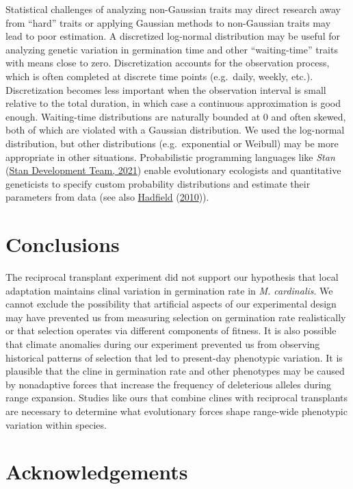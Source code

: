 \documentclass[
  12pt,
]{article}
\begin{document}
Statistical challenges of analyzing non-Gaussian traits may direct research away from ``hard'' traits or applying Gaussian methods to non-Gaussian traits may lead to poor estimation. A discretized log-normal distribution may be useful for analyzing genetic variation in germination time and other ``waiting-time'' traits with means close to zero. Discretization accounts for the observation process, which is often completed at discrete time points (e.g.~daily, weekly, etc.). Discretization becomes less important when the observation interval is small relative to the total duration, in which case a continuous approximation is good enough. Waiting-time distributions are naturally bounded at 0 and often skewed, both of which are violated with a Gaussian distribution. We used the log-normal distribution, but other distributions (e.g.~exponential or Weibull) may be more appropriate in other situations. Probabilistic programming languages like \emph{Stan} (\protect\hyperlink{ref-stan_development_team_stan_2021}{Stan Development Team, 2021}) enable evolutionary ecologists and quantitative geneticists to specify custom probability distributions and estimate their parameters from data (see also \protect\hyperlink{ref-hadfield_mcmc_2010}{Hadfield} (\protect\hyperlink{ref-hadfield_mcmc_2010}{2010})).

\hypertarget{conclusions}{%
\section{Conclusions}\label{conclusions}}

The reciprocal transplant experiment did not support our hypothesis that local adaptation maintains clinal variation in germination rate in \emph{M. cardinalis}. We cannot exclude the possibility that artificial aspects of our experimental design may have prevented us from measuring selection on germination rate realistically or that selection operates via different components of fitness. It is also possible that climate anomalies during our experiment prevented us from observing historical patterns of selection that led to present-day phenotypic variation. It is plausible that the cline in germination rate and other phenotypes may be caused by nonadaptive forces that increase the frequency of deleterious alleles during range expansion. Studies like ours that combine clines with reciprocal transplants are necessary to determine what evolutionary forces shape range-wide phenotypic variation within species.

\hypertarget{acknowledgements}{%
\section{Acknowledgements}\label{acknowledgements}}
\end{document}
